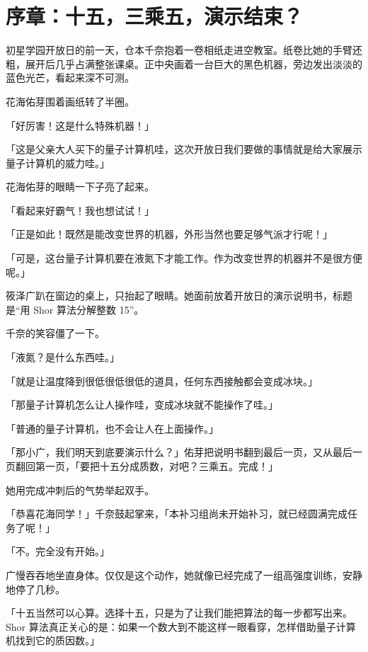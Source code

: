 

\section*{序章：十五，三乘五，演示结束？}
{}

初星学园开放日的前一天，仓本千奈抱着一卷相纸走进空教室。纸卷比她的手臂还粗，展开后几乎占满整张课桌。正中央画着一台巨大的黑色机器，旁边发出淡淡的蓝色光芒，看起来深不可测。

花海佑芽围着画纸转了半圈。

「好厉害！这是什么特殊机器！」

「这是父亲大人买下的量子计算机哇，这次开放日我们要做的事情就是给大家展示量子计算机的威力哇。」

花海佑芽的眼睛一下子亮了起来。

「看起来好霸气！我也想试试！」

「正是如此！既然是能改变世界的机器，外形当然也要足够气派才行呢！」

「可是，这台量子计算机要在液氮下才能工作。作为改变世界的机器并不是很方便呢。」

筱泽广趴在窗边的桌上，只抬起了眼睛。她面前放着开放日的演示说明书，标题是“用 Shor 算法分解整数 15”。

千奈的笑容僵了一下。

「液氮？是什么东西哇。」

「就是让温度降到很低很低很低的道具，任何东西接触都会变成冰块。」

「那量子计算机怎么让人操作哇，变成冰块就不能操作了哇。」

「普通的量子计算机，也不会让人在上面操作。」

「那小广，我们明天到底要演示什么？」佑芽把说明书翻到最后一页，又从最后一页翻回第一页，「要把十五分成质数，对吧？三乘五。完成！」

她用完成冲刺后的气势举起双手。

「恭喜花海同学！」千奈鼓起掌来，「本补习组尚未开始补习，就已经圆满完成任务了呢！」

「不。完全没有开始。」

广慢吞吞地坐直身体。仅仅是这个动作，她就像已经完成了一组高强度训练，安静地停了几秒。

「十五当然可以心算。选择十五，只是为了让我们能把算法的每一步都写出来。Shor 算法真正关心的是：如果一个数大到不能这样一眼看穿，怎样借助量子计算机找到它的质因数。」

